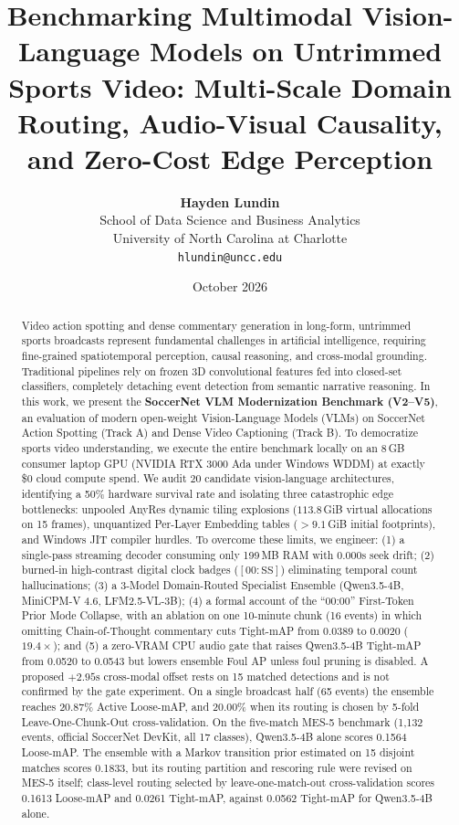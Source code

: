 \documentclass[10pt,twocolumn,letterpaper]{article}
\title{\textbf{Benchmarking Multimodal Vision-Language Models on Untrimmed Sports Video: Multi-Scale Domain Routing, Audio-Visual Causality, and Zero-Cost Edge Perception}}
\author{
  \textbf{Hayden Lundin} \\
  School of Data Science and Business Analytics \\
  University of North Carolina at Charlotte \\
  {\tt\small hlundin@uncc.edu}
}
\date{October 2026}
\begin{document}
\maketitle

\begin{abstract}
Video action spotting and dense commentary generation in long-form, untrimmed sports broadcasts represent fundamental challenges in artificial intelligence, requiring fine-grained spatiotemporal perception, causal reasoning, and cross-modal grounding. Traditional pipelines rely on frozen 3D convolutional features fed into closed-set classifiers, completely detaching event detection from semantic narrative reasoning. 
In this work, we present the \textbf{SoccerNet VLM Modernization Benchmark (V2--V5)}, an evaluation of modern open-weight Vision-Language Models (VLMs) on SoccerNet Action Spotting (Track A) and Dense Video Captioning (Track B).
To democratize sports video understanding, we execute the entire benchmark locally on an 8\,GB consumer laptop GPU (NVIDIA RTX 3000 Ada under Windows WDDM) at exactly \$0 cloud compute spend.
We audit 20 candidate vision-language architectures, identifying a 50\% hardware survival rate and isolating three catastrophic edge bottlenecks: unpooled AnyRes dynamic tiling explosions ($113.8$\,GiB virtual allocations on 15 frames), unquantized Per-Layer Embedding tables ($>9.1$\,GiB initial footprints), and Windows JIT compiler hurdles.
To overcome these limits, we engineer: (1) a single-pass streaming decoder consuming only 199\,MB RAM with 0.000s seek drift; (2) burned-in high-contrast digital clock badges ($[00:\text{SS}]$) eliminating temporal count hallucinations; (3) a 3-Model Domain-Routed Specialist Ensemble (Qwen3.5-4B, MiniCPM-V 4.6, LFM2.5-VL-3B); (4) a formal account of the ``00:00'' First-Token Prior Mode Collapse, with an ablation on one 10-minute chunk (16 events) in which omitting Chain-of-Thought commentary cuts Tight-mAP from 0.0389 to 0.0020 ($19.4\times$); and (5) a zero-VRAM CPU audio gate that raises Qwen3.5-4B Tight-mAP from 0.0520 to 0.0543 but lowers ensemble Foul AP unless foul pruning is disabled. A proposed $+2.95\text{s}$ cross-modal offset rests on 15 matched detections and is not confirmed by the gate experiment.
On a single broadcast half (65 events) the ensemble reaches 20.87\% Active Loose-mAP, and 20.00\% when its routing is chosen by 5-fold Leave-One-Chunk-Out cross-validation.
On the five-match MES-5 benchmark (1,132 events, official SoccerNet DevKit, all 17 classes), Qwen3.5-4B alone scores 0.1564 Loose-mAP. The ensemble with a Markov transition prior estimated on 15 disjoint matches scores 0.1833, but its routing partition and rescoring rule were revised on MES-5 itself; class-level routing selected by leave-one-match-out cross-validation scores 0.1613 Loose-mAP and 0.0261 Tight-mAP, against 0.0562 Tight-mAP for Qwen3.5-4B alone.

\end{abstract}
\end{document}
